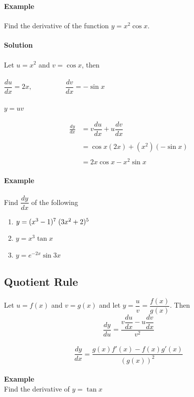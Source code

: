 \documentclass[11pt,a4paper]{article}
\begin{document}
\textbf{Example}\\\\
Find the derivative of the function $y=x^2 \cos x$.\\\\

\textbf{Solution}\\\\
Let $u=x^2$ and $v=\cos x$, then \\\\ $\dfrac{du}{dx}=2x,\hspace{2cm} \dfrac{dv}{dx}=-\sin x$\\\\
$y=uv$

\begin{align*}
\frac{dy}{dx} & = v \dfrac{du}{dx}+u \dfrac{dv}{dx}\\\\
& = \cos x (2x) + (x^2) (-\sin x)\\\\
& = 2x\cos x -x^2\sin x\\
\end{align*}

\textbf{Example}\\\\
Find $\dfrac{dy}{dx}$ of the following
\begin{enumerate}
\item $y=(x^3-1)^7\hspace{0.1cm} (3x^2+2)^5$\\
\item $y=x^3\tan x$\\
\item $y=e^{-2x}\sin 3x$\\
\end{enumerate}



\subsection{Quotient Rule}
Let $u=f(x)$ and $v=g(x)$ and let $y=\dfrac{u}{v}=\dfrac{f(x)}{g(x)}$. Then $$\frac{dy}{du}=\dfrac{v\dfrac{du}{dx}-u\dfrac{dv}{dx}}{v^2}$$\\
$$\frac{dy}{dx}=\frac{g(x)f'(x)-f(x)g'(x)}{(g(x))^2}$$\\

\textbf{Example}\\
Find the derivative of $y=\tan x$\\\\
\end{document}
